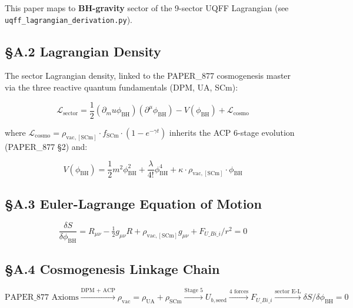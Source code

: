 \documentclass[12pt,a4paper]{article}
\begin{document}
This paper maps to \textbf{BH-gravity} sector of the 9-sector UQFF Lagrangian (see \texttt{uqff\_{lagrangian\_derivation}.py}).

\subsection{\S{}A.2 Lagrangian Density}

The sector Lagrangian density, linked to the PAPER\_877 cosmogenesis master via the three reactive quantum fundamentals (DPM, UA, SCm):

\begin{equation}
\mathcal{L}_{\mathrm{sector}} = \frac{1}{2}(\partial_mu \phi_{\mathrm{BH}})(\partial^\mu \phi_{\mathrm{BH}}) - V(\phi_{\mathrm{BH}}) + \mathcal{L}_{\mathrm{cosmo}}
\end{equation}

where $\mathcal{L}_{\mathrm{cosmo}} = \rho_{\mathrm{vac,[SCm]}} \cdot f_{\mathrm{SCm}} \cdot (1 - e^{-\gamma t})$ inherits the ACP 6-stage evolution (PAPER\_877 \S{}2) and:

\begin{equation}
V(\phi_{\mathrm{BH}}) = \frac{1}{2} m^2 \phi_{\mathrm{BH}}^2 + \frac{\lambda}{4!} \phi_{\mathrm{BH}}^4 + \kappa \cdot \rho_{\mathrm{vac,[SCm]}} \cdot \phi_{\mathrm{BH}}
\end{equation}

\subsection{\S{}A.3 Euler-Lagrange Equation of Motion}

\begin{equation}
\boxed{\frac{\delta S}{\delta \phi_{\mathrm{BH}}} = R_{\mu\nu} - \tfrac{1}{2}g_{\mu\nu}R + \rho_{\mathrm{vac,[SCm]}} g_{\mu\nu} + F_{U\_Bi\_i}/r^2 = 0}
\end{equation}

\subsection{\S{}A.4 Cosmogenesis Linkage Chain}

\begin{equation}
\text{PAPER\_877 Axioms} \xrightarrow{\text{DPM + ACP}} \rho_{\mathrm{vac}} = \rho_{\mathrm{UA}} + \rho_{\mathrm{SCm}} \xrightarrow{\text{Stage 5}} U_{b,\mathrm{seed}} \xrightarrow{\text{4 forces}} F_{U\_Bi\_i} \xrightarrow{\text{sector E-L}} \delta S/\delta \phi_{\mathrm{BH}} = 0
\end{equation}
\end{document}
